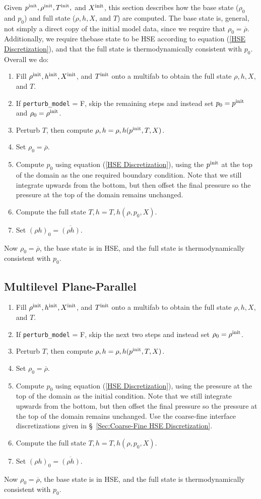 Given $p^{\rm init}, \rho^{\rm init}, T^{\rm init},$ and $X^{\rm init}$, this
section describes how the base state ($\rho_0$ and $p_0$) and full
state ($\rho, h, X$, and $T$) are computed.  The base state is, general, not
simply a direct copy of the initial model data, since we require that
$\rho_0 = \overline\rho$.  Additionally, we require thebase state to
be HSE according to equation (\ref{HSE Discretization}), and that the full
state is thermodynamically consistent with $p_0$.  Overall we do:
\begin{enumerate}
\item Fill $\rho^{\rm init}, h^{\rm init}, X^{\rm init}$, and $T^{\rm init}$ onto a 
  multifab to obtain the full state $\rho, h, X$, and $T$.
\item If {\tt perturb\_model} = F, skip the remaining steps and
  instead set $p_0 = p^{\rm init}$ and $\rho_0 = \rho^{\rm init}$.
\item Perturb $T$, then compute $\rho,h = \rho,h(p^{\rm init},T,X)$.
\item Set $\rho_0 = \overline\rho$.
\item Compute $p_0$ using equation (\ref{HSE Discretization}), using
  the $p^{\rm init}$ at the top of the domain as the one required boundary 
  condition.  Note that we still integrate upwards from the bottom, but then
  offset the final pressure so the pressure at the top of the domain
  remains unchanged.
\item Compute the full state $T,h = T,h(\rho,p_0,X)$.
\item Set $(\rho h)_0 = \overline{(\rho h)}$.
\end{enumerate}
Now $\rho_0 = \overline\rho$, the base state is in HSE, and the full
state is thermodynamically consistent with $p_0$.

\subsection{Multilevel Plane-Parallel}
\begin{enumerate}
\item Fill $\rho^{\rm init}, h^{\rm init}, X^{\rm init}$, and $T^{\rm init}$ onto
  a multifab to obtain the full state $\rho, h, X$, and $T$.
\item If {\tt perturb\_model} = F, skip the next two steps and instead
  set $\rho_0 = \rho^{\rm init}$.
\item Perturb $T$, then compute $\rho,h = \rho,h(p^{\rm init},T,X)$.
\item Set $\rho_0 = \overline\rho$.
\item Compute $p_0$ using equation (\ref{HSE Discretization}), using
  the pressure at the top of the domain as the initial condition.
  Note that we still integrate upwards from the bottom, but then
  offset the final pressure so the pressure at the top of the domain
  remains unchanged.  Use the coarse-fine interface discretizations
  given in \S~\ref{Sec:Coarse-Fine HSE Discretization}.
\item Compute the full state $T,h = T,h(\rho,p_0,X)$.
\item Set $(\rho h)_0 = \overline{(\rho h)}$.
\end{enumerate}
Now $\rho_0 = \overline\rho$, the base state is in HSE, and the full
state is thermodynamically consistent with $p_0$.

